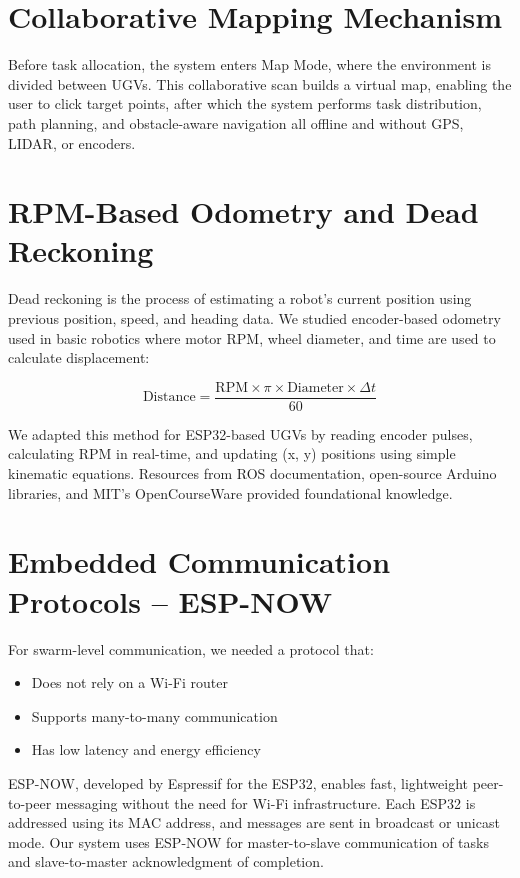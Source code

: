 \documentclass[a4paper,12pt]{report}
\begin{document}
\section{Collaborative Mapping Mechanism}
 Before task allocation, the system enters Map Mode, where the environment is divided
 between UGVs.
 This collaborative scan builds a virtual map, enabling the user to click target points, after
 which the system performs task distribution, path planning, and obstacle-aware navigation 
 all offline and without GPS, LIDAR, or encoders.
\section{RPM-Based Odometry and Dead Reckoning}
Dead reckoning is the process of estimating a robot’s current position using previous position, speed, and heading data. We studied encoder-based odometry used in basic robotics where motor RPM, wheel diameter, and time are used to calculate displacement:

\begin{equation*}
    \text{Distance} = \frac{\text{RPM} \times \pi \times \text{Diameter} \times \Delta t}{60}
\end{equation*}


We adapted this method for ESP32-based UGVs by reading encoder pulses, calculating RPM in real-time, and updating (x, y) positions using simple kinematic equations. Resources from ROS documentation, open-source Arduino libraries, and MIT's OpenCourseWare provided foundational knowledge.

\section{Embedded Communication Protocols – ESP-NOW}
For swarm-level communication, we needed a protocol that:
\begin{itemize}
    \item Does not rely on a Wi-Fi router
    \item Supports many-to-many communication
    \item Has low latency and energy efficiency
\end{itemize}

ESP-NOW, developed by Espressif for the ESP32, enables fast, lightweight peer-to-peer messaging without the need for Wi-Fi infrastructure. Each ESP32 is addressed using its MAC address, and messages are sent in broadcast or unicast mode. Our system uses ESP-NOW for master-to-slave communication of tasks and slave-to-master acknowledgment of completion.
\end{document}
